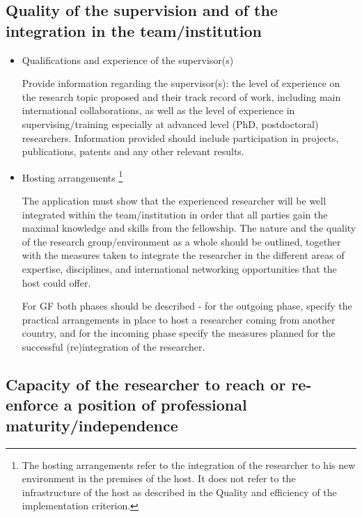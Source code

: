 \subsection{Quality of the supervision and of the integration in the team/institution}
\label{sec:excellence_supervision}

\begin{itemize}
  \item Qualifications and experience of the supervisor(s)

Provide information regarding the supervisor(s): 
the level of experience on the research topic proposed and their track record of work, 
including main international collaborations, 
as well as the level of experience in supervising/training especially at advanced level (PhD, postdoctoral) researchers.
Information provided should include participation in projects, publications, patents and any other relevant results.

  \item Hosting arrangements%
\footnote{The hosting arrangements refer to the integration of the researcher to his new environment in the premises of the host. 
It does not refer to the infrastructure of the host as described in the Quality and efficiency of the implementation criterion.}

The application must show that the experienced researcher will be well integrated within the team/institution in order that all parties gain the maximal knowledge and skills from the fellowship.
The nature and the quality of the research group/environment as a whole should be outlined, 
together with the measures taken to integrate the researcher in the different areas of expertise, disciplines, and international networking opportunities that the host could offer.

For GF both phases should be described - for the outgoing phase, specify the practical arrangements in place to host a researcher coming from another country, 
and for the incoming phase specify the measures planned for the successful (re)integration of the researcher.
\end{itemize}




\subsection{Capacity of the researcher to reach or re-enforce a position of professional maturity/independence}
\label{sec:excellence_maturity}

